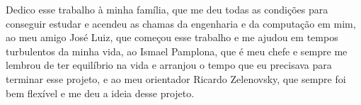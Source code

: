 Dedico esse trabalho à minha família, que me deu todas as condições para conseguir estudar e acendeu as chamas da engenharia e da computação em mim, ao meu amigo José Luiz, que começou esse trabalho e me ajudou em tempos turbulentos da minha vida, ao Ismael Pamplona, que é meu chefe e sempre me lembrou de ter equilíbrio na vida e arranjou o tempo que eu precisava para terminar esse projeto, e ao meu orientador Ricardo Zelenovsky, que sempre foi bem flexível e me deu a ideia desse projeto.